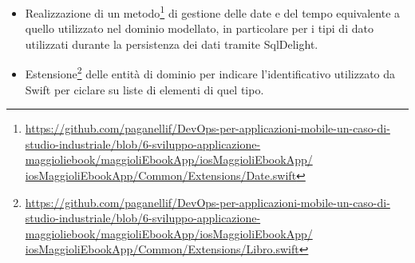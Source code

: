 \begin{itemize}
    \item Realizzazione di un metodo\footnote{\href{https://github.com/paganellif/DevOps-per-applicazioni-mobile-un-caso-di-studio-industriale/blob/6-sviluppo-applicazione-maggioliebook/maggioliEbookApp/iosMaggioliEbookApp/iosMaggioliEbookApp/Common/Extensions/Date.swift}{https://github.com/paganellif/DevOps-per-applicazioni-mobile-un-caso-di-studio-industriale/blob/6-sviluppo-applicazione-maggioliebook/maggioliEbookApp/iosMaggioliEbookApp/\\iosMaggioliEbookApp/Common/Extensions/Date.swift}} di gestione delle date e del tempo equivalente a quello utilizzato nel dominio modellato, in particolare per i tipi di dato utilizzati durante la persistenza dei dati tramite SqlDelight.
    \item Estensione\footnote{\href{https://github.com/paganellif/DevOps-per-applicazioni-mobile-un-caso-di-studio-industriale/blob/6-sviluppo-applicazione-maggioliebook/maggioliEbookApp/iosMaggioliEbookApp/iosMaggioliEbookApp/Common/Extensions/Libro.swift}{https://github.com/paganellif/DevOps-per-applicazioni-mobile-un-caso-di-studio-industriale/blob/6-sviluppo-applicazione-maggioliebook/maggioliEbookApp/iosMaggioliEbookApp/\\iosMaggioliEbookApp/Common/Extensions/Libro.swift}} delle entità di dominio per indicare l'identificativo utilizzato da Swift per ciclare su liste di elementi di quel tipo.
\end{itemize}

